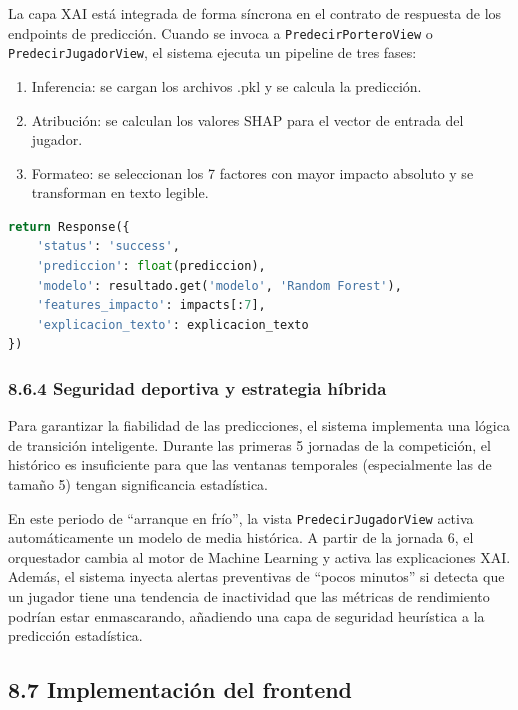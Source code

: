 La capa XAI está integrada de forma síncrona en el contrato de respuesta de los endpoints de predicción. Cuando se invoca a \texttt{PredecirPorteroView} o
 \texttt{PredecirJugadorView}, el sistema ejecuta un pipeline de tres fases:

\begin{enumerate}
\item Inferencia: se cargan los archivos .pkl y se calcula la predicción.
\item Atribución: se calculan los valores SHAP para el vector de entrada del jugador.
\item Formateo: se seleccionan los 7 factores con mayor impacto absoluto y se transforman en texto legible.
\end{enumerate}

\begin{lstlisting}[language=Python,caption={Contrato de respuesta API con metadatos de predicción y explicación para transparencia}]
return Response({
    'status': 'success',
    'prediccion': float(prediccion),
    'modelo': resultado.get('modelo', 'Random Forest'),
    'features_impacto': impacts[:7],
    'explicacion_texto': explicacion_texto
})
\end{lstlisting}

\subsubsection{8.6.4 Seguridad deportiva y estrategia híbrida}

Para garantizar la fiabilidad de las predicciones, el sistema implementa una lógica de transición inteligente. Durante las primeras 5 jornadas de la
 competición, el histórico es insuficiente para que las ventanas temporales (especialmente las de tamaño 5) tengan significancia estadística.

En este periodo de ``arranque en frío'', la vista \texttt{PredecirJugadorView} activa automáticamente un modelo de media histórica. A partir de la 
jornada 6, el orquestador cambia al motor de Machine Learning y activa las explicaciones XAI. Además, el sistema inyecta alertas 
preventivas de ``pocos minutos'' si detecta que un jugador tiene una tendencia de inactividad que las métricas de rendimiento podrían estar enmascarando, 
añadiendo una capa de seguridad heurística a la predicción estadística.

\subsection{8.7 Implementación del frontend}

